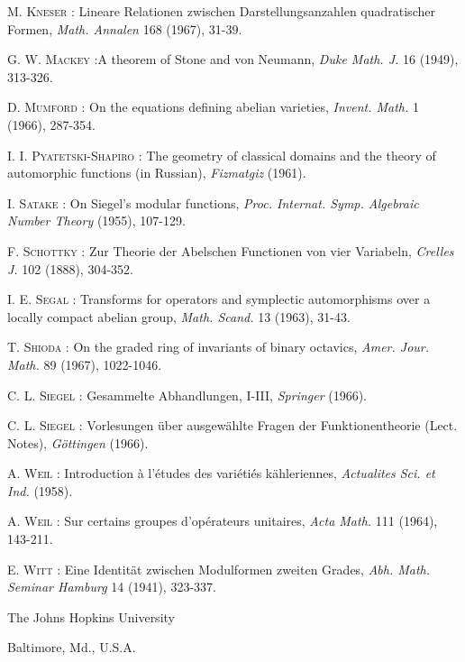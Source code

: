 \begin{thebibliography}{99}
 \textsc{M. Kneser :} Lineare Relationen zwischen Darstellungsanzahlen quadratischer Formen, {\em Math. Annalen} 168 (1967), 31-39.

 \textsc{G. W. Mackey :}\pageoriginale A theorem of Stone and von Neumann, {\em Duke Math. J.} 16 (1949), 313-326.

 \textsc{D. Mumford :} On the equations defining abelian varieties, {\em Invent. Math.} 1 (1966), 287-354.

 \textsc{I. I. Pyatetski-Shapiro :} The geometry of classical domains and the theory of automorphic functions (in Russian), {\em Fizmatgiz} (1961).

 \textsc{I. Satake :} On Siegel's modular functions, {\em Proc. Internat. Symp. Algebraic Number Theory} (1955), 107-129.

 \textsc{F. Schottky :} Zur Theorie der Abelschen Functionen von vier Variabeln, {\em Crelles J.} 102 (1888), 304-352.

 \textsc{I. E. Segal :} Transforms for operators and symplectic automorphisms over a locally compact abelian group, {\em Math. Scand.} 13 (1963), 31-43.

 \textsc{T. Shioda :} On the graded ring of invariants of binary octavics, {\em Amer. Jour. Math.} 89 (1967), 1022-1046.

 \textsc{C. L. Siegel :} Gesammelte Abhandlungen, I-III, {\em Springer} (1966).

 \textsc{C. L. Siegel :} Vorlesungen \"uber ausgew\"ahlte Fragen der Funktionentheorie (Lect. Notes), {\em G\"ottingen} (1966).

 \textsc{A. Weil :} Introduction \`a l'\'etudes des vari\'eti\'es k\"ahleriennes, {\em Actualites Sci. et Ind.} (1958).

 \textsc{A. Weil :} Sur certains groupes d'op\'erateurs unitaires, {\em Acta Math.} 111 (1964), 143-211.

 \textsc{E. Witt :} Eine Identit\"at zwischen Modulformen zweiten Grades, {\em Abh. Math. Seminar Hamburg} 14 (1941), 323-337.
\end{thebibliography}

\bigskip
\noindent
The Johns Hopkins University

\noindent
Baltimore, Md., U.S.A.
